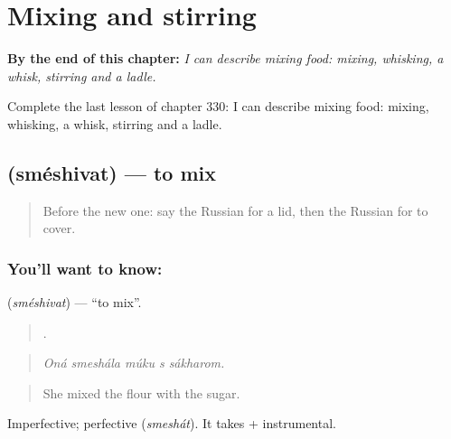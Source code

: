 
\chapter{Mixing and stirring}
\label{ch:ru-mixing-and-stirring}

\begin{chapteropening}
\textbf{By the end of this chapter:} \emph{I can describe mixing food: mixing, whisking, a whisk, stirring and a ladle.}

Complete the last lesson of chapter 330: I can describe mixing food: mixing, whisking, a whisk, stirring and a ladle.
\end{chapteropening}

\section[\texorpdfstring{\ru{смешивать} (sméshivat)}{смешивать (sméshivat)}]{ (sméshivat) — to mix}

\label{lesson:RU-C330-smeshivat}



\begin{quote}
Before the new one: say the Russian for a lid, then the Russian for to cover.
\end{quote}

\subsection*{You'll want to know: }
\textbf{} (\emph{sméshivat}) — \textquotedblleft{}to mix\textquotedblright{}.

\begin{quote}
    .
\end{quote}

\begin{quote}
\emph{Oná smeshála múku s sákharom.}
\end{quote}

\begin{quote}
She mixed the flour with the sugar.
\end{quote}

Imperfective; perfective \emph{} (\emph{smeshát}). It takes \emph{} + instrumental.

